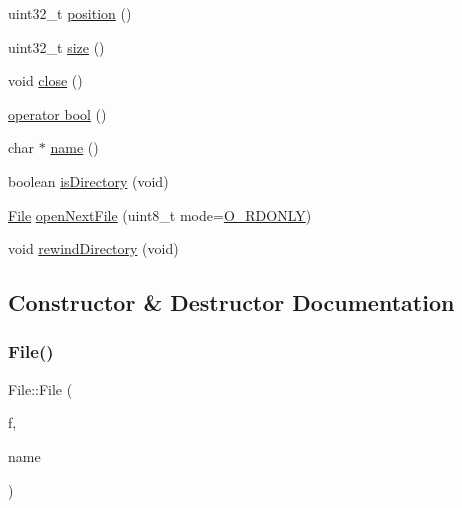 \begin{DoxyCompactItemize}
uint32\+\_\+t \hyperlink{class_s_d_lib_1_1_file_aae991c597c0bc4c5eb44c1f3b06a21ec}{position} ()
\item 
uint32\+\_\+t \hyperlink{class_s_d_lib_1_1_file_a603d3cd3319142d00a7ebd434970b017}{size} ()
\item 
void \hyperlink{class_s_d_lib_1_1_file_a83cbce54d6c3b8c2f417b51f6b3f488c}{close} ()
\item 
\hyperlink{class_s_d_lib_1_1_file_af171fbf441c899cf71d88b8b0b83d38b}{operator bool} ()
\item 
char $\ast$ \hyperlink{class_s_d_lib_1_1_file_a7dc80cb96e6062652690a42b584f230e}{name} ()
\item 
boolean \hyperlink{class_s_d_lib_1_1_file_a532cb01e66c863f0a0c70bad3acbcdfe}{is\+Directory} (void)
\item 
\hyperlink{class_s_d_lib_1_1_file}{File} \hyperlink{class_s_d_lib_1_1_file_a89d7761b6a1de4ce8e82accc6e687264}{open\+Next\+File} (uint8\+\_\+t mode=\hyperlink{_sd_fat_8h_ac13ca62d7e6f8f6d657d4607474652bf}{O\+\_\+\+R\+D\+O\+N\+LY})
\item 
void \hyperlink{class_s_d_lib_1_1_file_ad4af7c5cd14c201f2cf05353dc854ed5}{rewind\+Directory} (void)
\end{DoxyCompactItemize}


\subsection{Constructor \& Destructor Documentation}
\mbox{\label{class_s_d_lib_1_1_file_ad34490d697d9e56859f566534b360c54}} 
\subsubsection{\texorpdfstring{File()}{File()}\hspace{0.1cm}{\footnotesize\ttfamily [1/2]}}
{\footnotesize\ttfamily File\+::\+File (\begin{DoxyParamCaption}\item[{\hyperlink{class_sd_file}{Sd\+File}}]{f,  }\item[{const char $\ast$}]{name }\end{DoxyParamCaption})}

\mbox{\label{class_s_d_lib_1_1_file_a7dcb21db9e1623e84b9c3dee81c12617}} 
